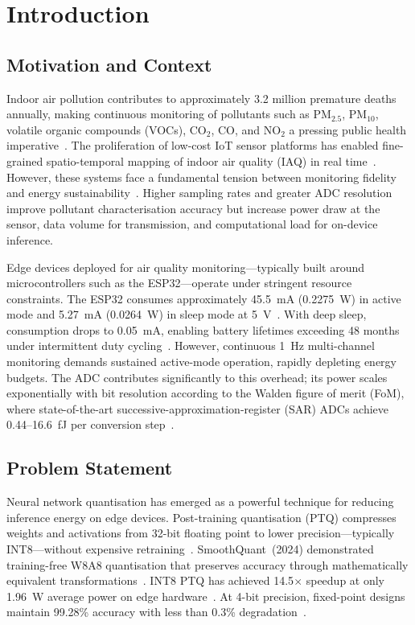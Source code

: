 \section{Introduction}
\label{sec:introduction}

\subsection{Motivation and Context}
\label{sec:intro_motivation}

Indoor air pollution contributes to approximately 3.2 million premature deaths annually, making continuous monitoring of pollutants such as PM$_{2.5}$, PM$_{10}$, volatile organic compounds (VOCs), CO$_2$, CO, and NO$_2$ a pressing public health imperative~\cite{karmakar2024exploring}. The proliferation of low-cost IoT sensor platforms has enabled fine-grained spatio-temporal mapping of indoor air quality (IAQ) in real time~\cite{dimitriou2025innovations, enviroiot2025}. However, these systems face a fundamental tension between monitoring fidelity and energy sustainability~\cite{energysustainable2023}. Higher sampling rates and greater ADC resolution improve pollutant characterisation accuracy but increase power draw at the sensor, data volume for transmission, and computational load for on-device inference.

Edge devices deployed for air quality monitoring---typically built around microcontrollers such as the ESP32---operate under stringent resource constraints. The ESP32 consumes approximately 45.5~mA (0.2275~W) in active mode and 5.27~mA (0.0264~W) in sleep mode at 5~V~\cite{esp32power2025}. With deep sleep, consumption drops to 0.05~mA, enabling battery lifetimes exceeding 48 months under intermittent duty cycling~\cite{benchmarking2022}. However, continuous 1~Hz multi-channel monitoring demands sustained active-mode operation, rapidly depleting energy budgets. The ADC contributes significantly to this overhead; its power scales exponentially with bit resolution according to the Walden figure of merit (FoM), where state-of-the-art successive-approximation-register (SAR) ADCs achieve 0.44--16.6~fJ per conversion step~\cite{waldenADC2018, andrulis2024adc}.

\subsection{Problem Statement}
\label{sec:intro_problem}

Neural network quantisation has emerged as a powerful technique for reducing inference energy on edge devices. Post-training quantisation (PTQ) compresses weights and activations from 32-bit floating point to lower precision---typically INT8---without expensive retraining~\cite{nagel2021whitepaper, quantsurvey2021}. SmoothQuant~(2024) demonstrated training-free W8A8 quantisation that preserves accuracy through mathematically equivalent transformations~\cite{smoothquant2024}. INT8 PTQ has achieved 14.5$\times$ speedup at only 1.96~W average power on edge hardware~\cite{palakodety2025tpu}. At 4-bit precision, fixed-point designs maintain 99.28\% accuracy with less than 0.3\% degradation~\cite{guo2020fixedpoint}.

